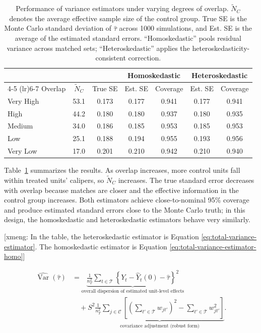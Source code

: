 \documentclass[11pt]{article}
\newcommand{\xmeng}[1]{
  {\color{blue} [xmeng: {#1}]}
 }
\newcommand{\Tset}{\mathcal{T}}
\newcommand{\Cset}{\mathcal{C}}
\newcommand{\Var}{\operatorname{Var}}
\begin{document}
\begin{table}[hbt!]
\centering
\begin{tabular}{lcccccc}
  \hline
  & & & \multicolumn{2}{c}{Homoskedastic} & \multicolumn{2}{c}{Heteroskedastic} \\
  \cmidrule(lr){4-5} \cmidrule(lr){6-7}
  Overlap & $\tilde{N}_C$ & True SE & Est. SE & Coverage & Est. SE & Coverage \\ 
  \hline
  Very High & 53.1 & 0.173 & 0.177 & 0.941 & 0.177 & 0.941 \\ 
  High & 44.2 & 0.180 & 0.180 & 0.937 & 0.180 & 0.935 \\ 
  Medium & 34.0 & 0.186 & 0.185 & 0.953 & 0.185 & 0.953 \\ 
  Low & 25.1 & 0.188 & 0.194 & 0.955 & 0.193 & 0.956 \\ 
  Very Low & 17.0 & 0.201 & 0.210 & 0.942 & 0.210 & 0.940 \\ 
   \hline
\end{tabular}
\caption{Performance of variance estimators under varying degrees of overlap. $\tilde{N}_C$ denotes the average effective sample size of the control group. True SE is the Monte Carlo standard deviation of $\hat{\tau}$ across 1000 simulations, and Est. SE is the average of the estimated standard errors. ``Homoskedastic'' pools residual variance across matched sets; ``Heteroskedastic'' applies the heteroskedasticity-consistent correction.}
\label{tab:toy_var_pooled_vs_het}
\end{table}



Table~\ref{tab:toy_var_pooled_vs_het} summarizes the results.
As overlap increases, more control units fall within treated units' calipers, so $\tilde{N}_C$ increases.
The true standard error decreases with overlap because matches are closer and the effective information in the control group increases.
Both estimators achieve close-to-nominal 95\% coverage and produce estimated standard errors close to the Monte Carlo truth; in this design, the homoskedastic and heteroskedastic estimators behave very similarly.


\xmeng{In the table, the heteroskedastic estimator is Equation \ref{eq:total-variance-estimator}. The homoskedastic estimator is Equation \ref{eq:total-variance-estimator-homo}} 
\begin{align}
\label{eq:total-variance-estimator-homo}
\widehat{\Var}(\hat{\tau})
&=
\underbrace{\frac{1}{n_T^2}\sum_{t\in\Tset}
\left\{Y_t-\hat{Y}_t(0)-\hat{\tau}\right\}^2}_{\text{overall dispersion of estimated unit-level effects}}
\nonumber\\
&\quad+
S^2 \underbrace{\frac{1}{n_T^2}\sum_{j\in\Cset} 
\left[
\left(\sum_{t'\in\Tset} w_{jt'}\right)^2
-
\sum_{t'\in\Tset} w_{jt'}^2
\right]}_{\text{covariance adjustment (robust form)}}.
\end{align}
\end{document}

